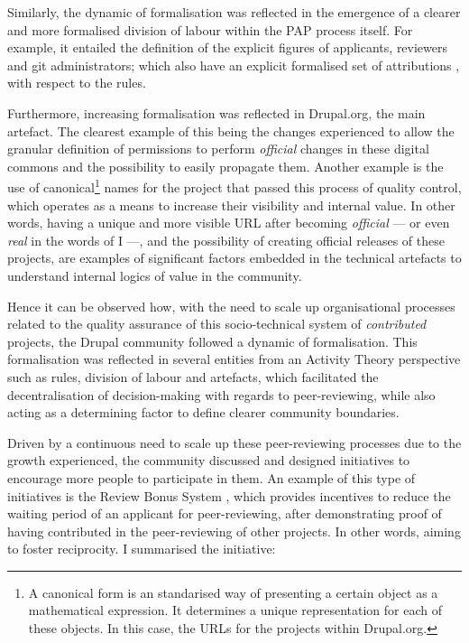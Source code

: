 Similarly, the dynamic of formalisation was reflected in the emergence of a clearer and more formalised division of labour within the PAP process itself. For example, it entailed the definition of the explicit figures of applicants, reviewers and git administrators; which also have an explicit formalised set of attributions \parencite{drupalorg-git-admins-01:2016:Online, drupalorg-git-admins-02:2016:Online}, with respect to the rules.

Furthermore, increasing formalisation was reflected in Drupal.org, the main artefact. The clearest example of this being the changes experienced to allow the granular definition of permissions to perform \textit{official} changes in these digital commons and the possibility to easily propagate them. Another example is the use of canonical\footnote{A canonical form is an standarised way of presenting a certain object as a mathematical expression. It determines a unique representation for each of these objects. In this case, the URLs for the projects within Drupal.org.} names for the project that passed this process of quality control, which operates as a means to increase their visibility and internal value. In other words, having a unique and more visible URL after becoming \textit{official} --- or even \textit{real} in the words of I ---,  and the possibility of creating official releases of these projects, are examples of significant factors embedded in the technical artefacts to understand internal logics of value in the community.

Hence it can be observed how, with the need to scale up organisational processes related to the quality assurance of this socio-technical system of \textit{contributed} projects, the Drupal community followed a dynamic of formalisation. This formalisation was reflected in several entities from an Activity Theory perspective such as rules, division of labour and artefacts, which facilitated the decentralisation of decision-making with regards to peer-reviewing, while also acting as a determining factor to define clearer community boundaries.

Driven by a continuous need to scale up these peer-reviewing processes due to the growth experienced, the community discussed and designed initiatives to encourage more people to participate in them. An example of this type of initiatives is the Review Bonus System \parencite{drupalorg-review-bonus-system:2016:Online}, which provides incentives to reduce the waiting period of an applicant for peer-reviewing, after demonstrating proof of having contributed in the peer-reviewing of other projects. In other words, aiming to foster reciprocity. I summarised the initiative:

